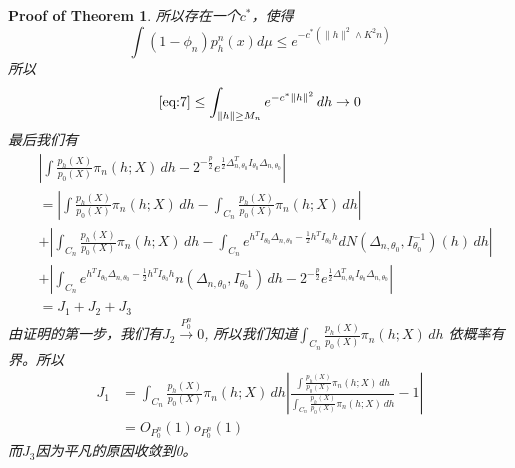 \documentclass[review]{elsarticle}
\newtheorem{proofOfTheorem}{Proof of Theorem}
\begin{document}
\begin{proofOfTheorem}
所以存在一个$c^*$，使得
\begin{equation}
\int (1-\phi_n)p^n_h(x)d\mu\leq e^{-c^*(\|h\|^2\wedge K^2n)}
\end{equation}
所以
\begin{equation}
\eqref{eq:7}\leq \int_{\|h\|\geq M_n}e^{-c^*\|h\|^2}\, dh  \to 0
\end{equation}
最后我们有
\begin{equation}
    \begin{aligned}
        &\left|\int \frac{p_h(X)}{p_0(X)}\pi_n (h;X) \, dh-2^{-\frac{p}{2}}e^{\frac{1}{2}\Delta_{n,\theta_0}^TI_{\theta_0}\Delta_{n,\theta_0}}
 \right|\\
        &=\left|\int \frac{p_h(X)}{p_0(X)}\pi_n (h;X) \, dh-\int_{C_n} \frac{p_h(X)}{p_0(X)}\pi_n (h;X) \, dh\right|\\
        &+\left|\int_{C_n} \frac{p_h(X)}{p_0(X)}\pi_n (h;X) \, dh -\int_{C_n} e^{h^TI_{\theta_0}\Delta_{n,\theta_0}-\frac{1}{2}h^TI_{\theta_0}h}dN(\Delta_{n,\theta_0},I_{\theta_0}^{-1})(h)\, dh\right|\\
        &+\left| \int_{C_n} e^{h^TI_{\theta_0}\Delta_{n,\theta_0}-\frac{1}{2}h^TI_{\theta_0}h}n(\Delta_{n,\theta_0},I_{\theta_0}^{-1})\, dh-2^{-\frac{p}{2}}e^{\frac{1}{2}\Delta_{n,\theta_0}^TI_{\theta_0}\Delta_{n,\theta_0}}
 \right|\\
        &=J_1+J_2+J_3
\end{aligned}
\end{equation}
由证明的第一步，我们有$J_2\xrightarrow{P^n_0}0$, 所以我们知道$\int_{C_n} \frac{p_h(X)}{p_0(X)}\pi_n (h;X) \, dh $ 依概率有界。所以
\begin{equation}
\begin{aligned}
    J_1&=\int_{C_n} \frac{p_h(X)}{p_0(X)}\pi_n (h;X) \, dh\left|\frac{\int \frac{p_h(X)}{p_0(X)}\pi_n (h;X) \, dh}{\int_{C_n} \frac{p_h(X)}{p_0(X)}\pi_n (h;X) \, dh}-1\right|\\
       &=O_{P_0^n}(1)o_{P_0^n}(1)
\end{aligned}
\end{equation}
而$J_3$因为平凡的原因收敛到0。 
\end{proofOfTheorem}
\end{document}
